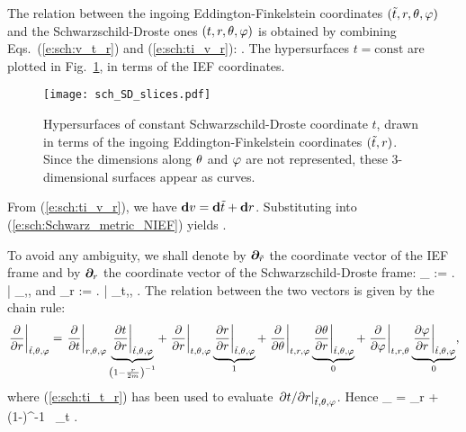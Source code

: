 The relation between the ingoing Eddington-Finkelstein coordinates
$({\tilde t}, r, \theta,\varphi)$
and the Schwarzschild-Droste ones $(t,r,\theta,\varphi)$ is obtained by combining
Eqs.~(\ref{e:sch:v_t_r}) and (\ref{e:sch:ti_v_r}):
\be \label{e:sch:ti_t_r}
      .
\ee
The hypersurfaces $t=\mathrm{const}$ are plotted in Fig.~\ref{f:sch:SD_slices},
in terms of the IEF coordinates.

\begin{figure}
\centerline{\texttt{[image: sch\_SD\_slices.pdf]}}
\caption[]{\label{f:sch:SD_slices} \footnotesize
Hypersurfaces of constant Schwarzschild-Droste coordinate $t$, drawn in terms
of the ingoing Eddington-Finkelstein coordinates $({\tilde t},r)$. Since the dimensions
along $\theta$ and $\varphi$ are not represented, these 3-dimensional surfaces appear
as curves.}
\end{figure}

From (\ref{e:sch:ti_v_r}), we have $\mathbf{d} v = \mathbf{d}{\tilde t} + \mathbf{d} r$. Substituting
into (\ref{e:sch:Schwarz_metric_NIEF}) yields
\be \label{e:sch:Schwarz_metric_EF}
    .
\ee

To avoid any ambiguity, we shall denote by $\bm{\partial}_{\tilde{r}}$ the
coordinate vector of the IEF frame and by
$\bm{\partial}_r$ the coordinate vector of the Schwarzschild-Droste frame:
\be
    \wpar_{} := \left.  \right| _{\ti,\th,\ph}
    \qquad\mbox{and}\qquad
    \wpar_r := \left.  \right| _{t,\th,\ph} .
\ee
The relation between the two vectors is given by the chain rule:
\[
    \left. \frac{\partial }{\partial r} \right| _{{\tilde t},\theta,\varphi}  =
    \left. \frac{\partial }{\partial t} \right| _{r,\theta,\varphi}
    \underbrace{ \left. \frac{\partial t}{\partial r} \right| _{{\tilde t},\theta,\varphi}}_{\left(1-\frac{r}{2m}\right)^{-1}}
  + \left. \frac{\partial }{\partial r} \right| _{t,\theta,\varphi}
   \underbrace{\left. \frac{\partial r}{\partial r} \right| _{{\tilde t},\theta,\varphi}}_{1}
  + \left. \frac{\partial }{\partial \theta} \right| _{t,r,\varphi}
  \underbrace{\left. \frac{\partial \theta}{\partial r} \right| _{{\tilde t},\theta,\varphi}}_{0}
  + \left. \frac{\partial }{\partial \varphi} \right| _{t,r,\theta}
  \underbrace{\left. \frac{\partial \varphi}{\partial r} \right| _{{\tilde t},\theta,\varphi}}_{0} ,
\]
where (\ref{e:sch:ti_t_r}) has been used to evaluate
$\left. {\partial t}/{\partial r} \right| _{{\tilde t},\theta,\varphi}$. Hence
\be \label{e:sch:wpar_tilde_r}
    \wpar_{} = \wpar_r + \left(1-\right)^{-1} \, \wpar_t .
\ee

